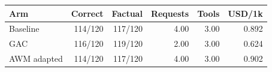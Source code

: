 \begin{tabular}{lrrrrr}
\toprule
Arm & Correct & Factual & Requests & Tools & USD/1k \\
\midrule
Baseline & 114/120 & 117/120 & 4.00 & 3.00 & 0.892 \\
GAC & 116/120 & 119/120 & 2.00 & 3.00 & 0.624 \\
AWM adapted & 114/120 & 117/120 & 4.00 & 3.00 & 0.902 \\
\bottomrule
\end{tabular}
